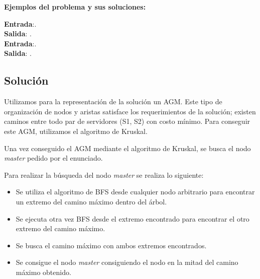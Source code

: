 \documentclass[a4paper, 10pt, twoside]{article}
\begin{document}
\textbf{Ejemplos del problema y sus soluciones:}

\textbf{Entrada}:. \\
\textbf{Salida}: . \\

\textbf{Entrada}:. \\
\textbf{Salida}: . \\

\subsection{Solución}
Utilizamos para la representación de la solución un AGM. Este tipo de organización de nodos y aristas satisface los requerimientos de la solución; existen caminos entre todo par de servidores (S1, S2) con costo mínimo. Para conseguir este AGM, utilizamos el algoritmo de Kruskal.

Una vez conseguido el AGM mediante el algoritmo de Kruskal, se busca el nodo \textit{master} pedido por el enunciado.

Para realizar la búsqueda del nodo \textit{master} se realiza lo siguiente:

\begin{itemize}
\item Se utiliza el algoritmo de BFS desde cualquier nodo arbitrario para encontrar un extremo del camino máximo dentro del árbol.
\item Se ejecuta otra vez BFS desde el extremo encontrado para encontrar el otro extremo del camino máximo.
\item Se busca el camino máximo con ambos extremos encontrados.
\item Se consigue el nodo \textit{master} consiguiendo el nodo en la mitad del camino máximo obtenido.
\end{itemize}
\end{document}
